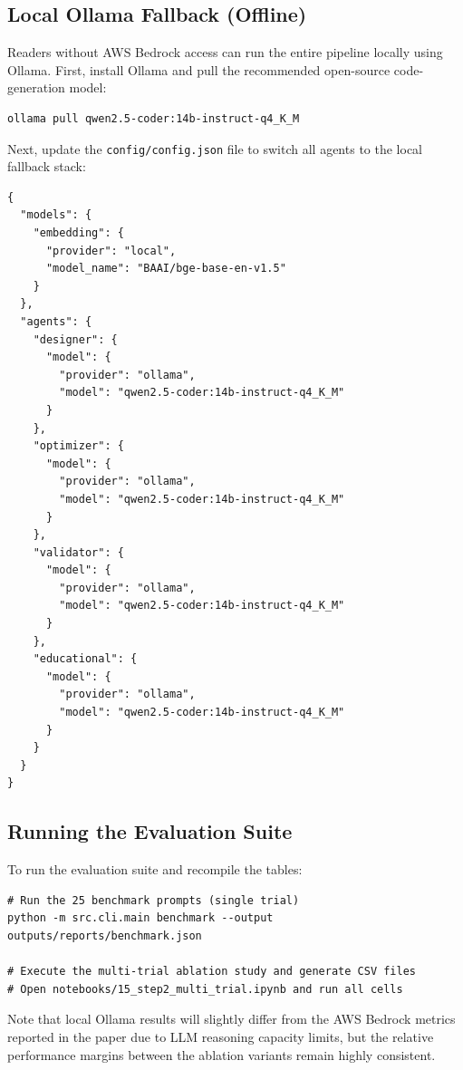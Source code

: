 \subsection*{Local Ollama Fallback (Offline)}
Readers without AWS Bedrock access can run the entire pipeline locally using Ollama. First, install Ollama and pull the recommended open-source code-generation model:
\begin{verbatim}
ollama pull qwen2.5-coder:14b-instruct-q4_K_M
\end{verbatim}

Next, update the \texttt{config/config.json} file to switch all agents to the local fallback stack:
\begin{verbatim}
{
  "models": {
    "embedding": {
      "provider": "local",
      "model_name": "BAAI/bge-base-en-v1.5"
    }
  },
  "agents": {
    "designer": {
      "model": {
        "provider": "ollama",
        "model": "qwen2.5-coder:14b-instruct-q4_K_M"
      }
    },
    "optimizer": {
      "model": {
        "provider": "ollama",
        "model": "qwen2.5-coder:14b-instruct-q4_K_M"
      }
    },
    "validator": {
      "model": {
        "provider": "ollama",
        "model": "qwen2.5-coder:14b-instruct-q4_K_M"
      }
    },
    "educational": {
      "model": {
        "provider": "ollama",
        "model": "qwen2.5-coder:14b-instruct-q4_K_M"
      }
    }
  }
}
\end{verbatim}

\subsection*{Running the Evaluation Suite}
To run the evaluation suite and recompile the tables:
\begin{verbatim}
# Run the 25 benchmark prompts (single trial)
python -m src.cli.main benchmark --output outputs/reports/benchmark.json

# Execute the multi-trial ablation study and generate CSV files
# Open notebooks/15_step2_multi_trial.ipynb and run all cells
\end{verbatim}
Note that local Ollama results will slightly differ from the AWS Bedrock metrics reported in the paper due to LLM reasoning capacity limits, but the relative performance margins between the ablation variants remain highly consistent.
